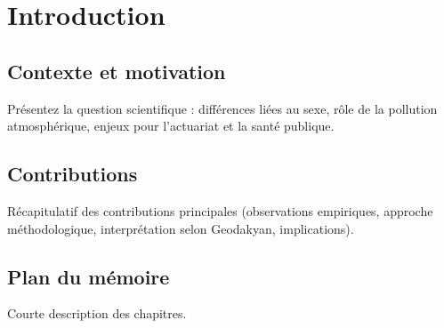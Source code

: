 \chapter{Introduction}
\label{chap:intro}
\section{Contexte et motivation}
Présentez la question scientifique : différences liées au sexe, rôle de la pollution atmosphérique, enjeux pour l'actuariat et la santé publique.


\section{Contributions}
Récapitulatif des contributions principales (observations empiriques, approche méthodologique, interprétation selon Geodakyan, implications).


\section{Plan du mémoire}
Courte description des chapitres.